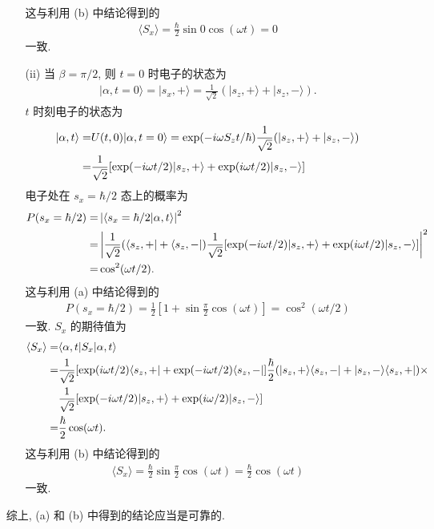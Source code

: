\documentclass{assignment}
\begin{document}
\begin{sol}
\begin{itemize}
\begin{itemize}
\begin{align}
            \end{align}
            这与利用 (b) 中结论得到的
            \begin{align}
                \langle S_x\rangle=\frac{\hbar}{2}\sin 0\cos(\omega t)=0
            \end{align}
            一致.
            \item[(ii)] 当 $\beta=\pi/2$, 则 $t=0$ 时电子的状态为
            \begin{align}
                \lvert\alpha,t=0\rangle=\lvert s_x,+\rangle=\frac{1}{\sqrt{2}}(\lvert s_z,+\rangle+\lvert s_z,-\rangle).
            \end{align}
            $t$ 时刻电子的状态为
            \begin{align}
                \notag\lvert\alpha,t\rangle=&U(t,0)\lvert\alpha,t=0\rangle=\exp(-i\omega S_zt/\hbar)\frac{1}{\sqrt{2}}(\lvert s_z,+\rangle+\lvert s_z,-\rangle)\\
                =&\frac{1}{\sqrt{2}}[\exp(-i\omega t/2)\lvert s_z,+\rangle+\exp(i\omega t/2)\lvert s_z,-\rangle]
            \end{align}
            电子处在 $s_x=\hbar/2$ 态上的概率为
            \begin{align}
                \notag P(s_x=\hbar/2)=&\left\lvert\langle s_x=\hbar/2\vert\alpha,t\rangle\right\rvert^2\\
                \notag=&\left\lvert\frac{1}{\sqrt{2}}(\langle s_z,+\rvert+\langle s_z,-\rvert)\frac{1}{\sqrt{2}}[\exp(-i\omega t/2)\lvert s_z,+\rangle+\exp(i\omega t/2)\lvert s_z,-\rangle]\right\rvert^2\\
                =&\cos^2(\omega t/2).
            \end{align}
            这与利用 (a) 中结论得到的
            \begin{align}
                P(s_x=\hbar/2)=\frac{1}{2}\left[1+\sin\frac{\pi}{2}\cos(\omega t)\right]=\cos^2(\omega t/2)
            \end{align}
            一致. $S_x$ 的期待值为
            \begin{align}
                \notag\langle S_x\rangle=&\langle\alpha,t\rvert S_x\lvert\alpha,t\rangle\\
                \notag=&\frac{1}{\sqrt{2}}[\exp(i\omega t/2)\langle s_z,+\rvert+\exp(-i\omega t/2)\langle s_z,-\rvert]\frac{\hbar}{2}(\lvert s_z,+\rangle\langle s_z,-\rvert+\lvert s_z,-\rangle\langle s_z,+\rvert)\times\\
                \notag&\frac{1}{\sqrt{2}}[\exp(-i\omega t/2)\lvert s_z,+\rangle+\exp(i\omega /2)\lvert s_z,-\rangle]\\
                =&\frac{\hbar}{2}\cos(\omega t).
            \end{align}
            这与利用 (b) 中结论得到的
            \begin{align}
                \langle S_x\rangle=\frac{\hbar}{2}\sin\frac{\pi}{2}\cos(\omega t)=\frac{\hbar}{2}\cos(\omega t)
            \end{align}
            一致.
        \end{itemize}
        综上, (a) 和 (b) 中得到的结论应当是可靠的.
    \end{itemize}
\end{sol}
\end{document}
